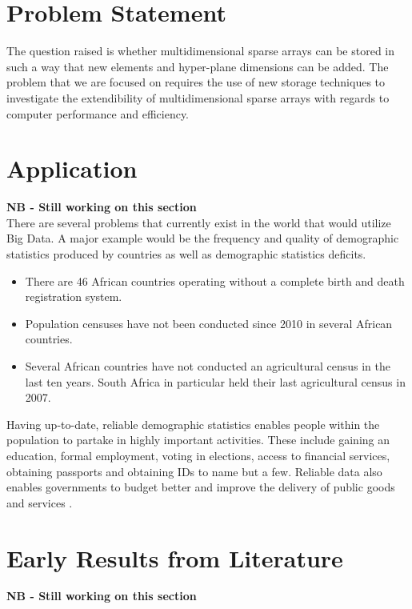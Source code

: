 \section{Problem Statement}
The question raised is whether multidimensional sparse arrays can be stored in such a way that new elements and hyper-plane dimensions can be added. The problem that we are focused on requires the use of new storage techniques to investigate the extendibility of multidimensional sparse arrays with regards to computer performance and efficiency.

\section{Application}
\textbf{NB - Still working on this section}\\
There are several problems that currently exist in the world that would utilize Big Data. A major example would be the frequency and quality of demographic statistics produced by countries as well as demographic statistics deficits.
\begin{itemize}
	\item There are 46 African countries operating without a complete birth and death registration system.
	\item Population censuses have not been conducted since 2010 in several African countries.
	\item Several African countries have not conducted an agricultural census in the last ten years. South Africa in particular held their last agricultural census in 2007.
\end{itemize}

Having up-to-date, reliable demographic statistics enables people within the population to partake in highly important activities. These include gaining an education, formal employment, voting in elections, access to financial services, obtaining passports and obtaining IDs to name but a few. Reliable data also enables governments to budget better and improve the delivery of public goods and services \cite{mo:2015:sin}.

\section{Early Results from Literature}
\textbf{NB - Still working on this section}

